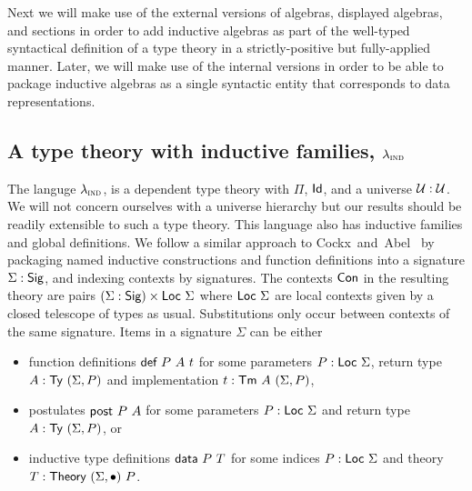 Next we will make use of the external versions of algebras, displayed algebras,
and sections in order to add inductive algebras as part of the well-typed
syntactical definition of a type theory in a strictly-positive but fully-applied
manner. Later, we will make use of the internal versions in order to be able to
package inductive algebras as a single syntactic entity that corresponds to data
representations.

\subsection{A type theory with inductive families, $\lambda_{\textsc{ind}}$}\label{sub:lambdaind}

The languge $\lambda_{\textsc{ind}}$, is a dependent type theory with $\Pi$, $\textsf{Id}$, and
a universe $\mathcal{U} : \mathcal{U}$. We will not concern ourselves with a universe
hierarchy but our results should be readily extensible to such a type theory.
This language also has inductive families and global definitions. We follow a
similar approach
to Cockx~and~Abel~\cite{Cockx2018-fk} by packaging named inductive constructions
and function definitions into a signature $\Sigma : \textsf{Sig}$, and indexing contexts
by signatures. The contexts $\textsf{Con}$ in the resulting theory are pairs $(\Sigma :
\textsf{Sig}) \times \textsf{Loc}\ \Sigma$ where $\Loc\ \Sigma$ are local contexts given by a
closed telescope of types as usual. Substitutions only occur between contexts of
the same signature. Items in a signature $\Sigma$ can be either

\begin{itemize}
	\item function definitions $\mta{def}\ P\ A\ t$ for some parameters $P : \textsf{Loc}\
		      \Sigma$, return type $A : \textsf{Ty}\ (\Sigma, P)$ and implementation $t : \textsf{Tm}\ A\ (\Sigma, P)$,
	\item postulates $\textsf{post}\ P\ A$ for some parameters $P : \textsf{Loc}\
		      \Sigma$ and return type $A : \textsf{Ty}\ (\Sigma, P)$, or
	\item inductive type definitions $\mta{data}\ P\ T$ for some indices $P :
		      \textsf{Loc}\ \Sigma$ and theory $T : \textsf{Theory}\ (\Sigma, \bullet)\ P$.
\end{itemize}


